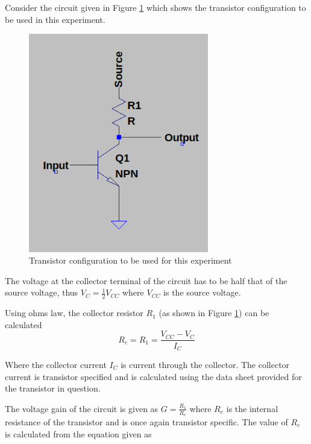 \documentclass[12pt, a4paper]{article}
\begin{document}
	 Consider the circuit given in Figure \ref{fig:transistor_configuration_circuit} which shows the transistor configuration to be used in this experiment.


	 \begin{figure}
	 	\centering
		\label{fig:transistor_configuration_circuit}
		\includegraphics[width=0.7\textwidth]{images/transistor_configuration_circuit.png}
		\caption{Transistor configuration to be used for this experiment}
	 \end{figure}

 	The voltage at the collector terminal of the circuit has to be half that of the source voltage, thus $V_C = \frac{1}{2}V_{CC}$ where $V_{CC}$ is the source voltage.

 	Using ohms law, the collector resistor $R_1$ (as shown in Figure \ref{fig:transistor_configuration_circuit}) can be calculated
 	\begin{equation}
 		R_c = R_1 = \frac{V_{CC}-V_C}{I_C}
 	\end{equation}

 	Where the collector current $I_C$ is current through the collector. The collector current is transistor specified and is calculated using the data sheet provided for the transistor in question. 

 	The voltage gain of the circuit is given as $G = \frac{R_1}{R_e}$ where $R_e$ is the internal resistance of the transistor and is once again transistor specific. The value of $R_e$ is calculated from the equation given as 
\end{document}
